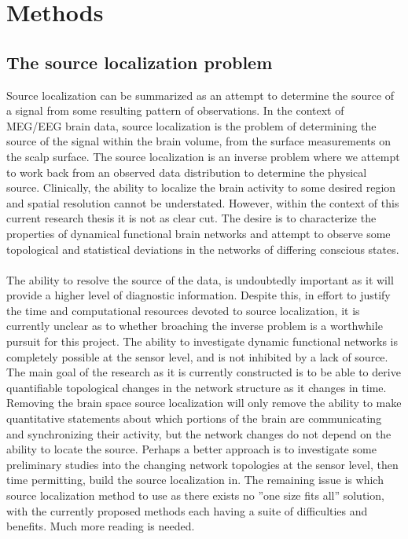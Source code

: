 \documentclass{article}
\begin{document}
\section{Methods}

\subsection{The source localization problem}
Source localization can be summarized as an attempt to determine the source of a signal from some resulting pattern of observations. In the context of MEG/EEG brain data, source localization is the problem of determining the source of the signal within the brain volume, from the surface measurements on the scalp surface. The source localization is an inverse problem where we attempt to work back from an observed data distribution to determine the physical source. Clinically, the ability to localize the brain activity to some desired region and spatial resolution cannot be understated. However, within the context of this current research thesis it is not as clear  cut. The desire is to characterize the properties of dynamical functional brain networks and attempt to observe some topological and statistical deviations in the networks of differing conscious states.\\ 
\\
The ability to resolve the source of the data, is undoubtedly important as it will provide a higher level of diagnostic information. Despite this, in effort to justify the time and computational resources devoted to source localization, it is currently unclear as to whether broaching the inverse problem is a worthwhile pursuit for this project. The ability to investigate dynamic functional networks is completely possible at the sensor level, and is not inhibited by a lack of source. The main goal of the research as it is currently constructed is to be able to derive quantifiable topological changes in the network structure as it changes in time. Removing the brain space source localization will  only remove the ability to make quantitative statements about which portions of the brain are communicating and synchronizing their activity, but the network changes do not depend on the ability to locate the source. Perhaps a better approach is to investigate some preliminary studies  into the changing network topologies at the sensor level, then time permitting, build the source localization in. The remaining issue is which source localization method to use as there exists no ''one size fits all'' solution, with the currently proposed methods each having a suite of difficulties and  benefits. Much more reading is needed. 
\end{document}
